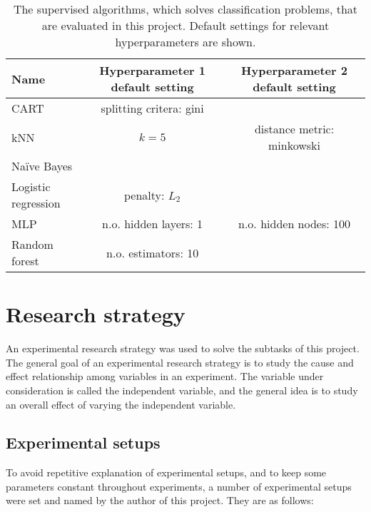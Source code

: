 	\begin{table}[H]
		\centering
		\caption{The supervised algorithms, which solves classification problems, that are evaluated in this project. Default settings for relevant hyperparameters are shown.}
		\begin{tabular}[3]{l | c | c }
    			Name & Hyperparameter 1 default setting & Hyperparameter 2 default setting \\ 
			 \hline
			CART & splitting critera: gini &  \\ \hline
			kNN & $k = 5$ & distance metric: minkowski \\ \hline
			Naïve Bayes &  & \\ \hline
			Logistic regression & penalty: $L_2$ & \\ \hline
			MLP & n.o. hidden layers: 1 & n.o. hidden nodes: 100 \\ \hline
			Random forest & n.o. estimators: 10 &   
			\label{table:evaluated_algorithms_classification}
		\end{tabular}
	\end{table}


\section{Research strategy}
	An experimental research strategy was used to solve the subtasks of this project. The general goal of an experimental research strategy is to study the cause and effect relationship among variables in an experiment. The variable under consideration is called the independent variable, and the general idea is to study an overall effect of varying the independent variable.  


	\subsection{Experimental setups} \label{sec:exp_setups}
	To avoid repetitive explanation of experimental setups, and to keep some parameters constant throughout experiments, a number of experimental setups were set and named by the author of this project. They are as follows:

